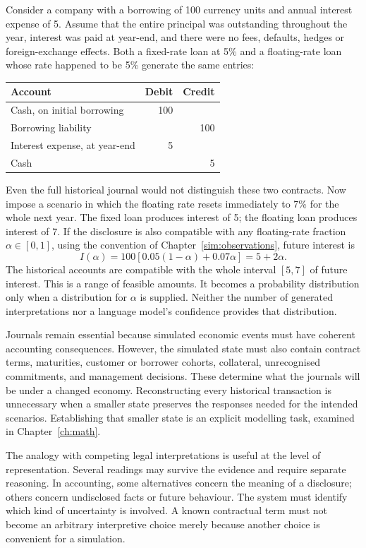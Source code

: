 Consider a company with a borrowing of 100 currency units and annual interest
expense of 5. Assume that the entire principal was outstanding throughout the
year, interest was paid at year-end, and there were no fees, defaults, hedges or
foreign-exchange effects. Both a fixed-rate loan at 5\% and a floating-rate loan
whose rate happened to be 5\% generate the same entries:
\begin{center}
\begin{tabular}{lrr}
\toprule Account & Debit & Credit\\\midrule
Cash, on initial borrowing &100&\\
Borrowing liability &&100\\\midrule
Interest expense, at year-end &5&\\
Cash &&5\\\bottomrule
\end{tabular}
\end{center}
Even the full historical journal would not distinguish these two contracts.
Now impose a scenario in which the floating rate resets immediately to 7\%
for the whole next year. The fixed loan produces interest of 5; the floating
loan produces interest of 7. If the disclosure is also compatible with any
floating-rate fraction $\alpha\in[0,1]$, using the convention of
Chapter~\ref{sim:observations}, future interest is
\begin{equation}\label{eq:running}
 I(\alpha)=100[0.05(1-\alpha)+0.07\alpha]=5+2\alpha.
\end{equation}
The historical accounts are compatible with the whole interval $[5,7]$ of
future interest. This is a range of feasible amounts. It becomes a probability
distribution only when a distribution for $\alpha$ is supplied. Neither the
number of generated interpretations nor a language model's confidence provides
that distribution.

Journals remain essential because simulated economic events must have coherent
accounting consequences. However, the simulated state must also contain
contract terms, maturities, customer or borrower cohorts, collateral,
unrecognised commitments, and management decisions. These determine what the
journals will be under a changed economy. Reconstructing every historical
transaction is unnecessary when a smaller state preserves the responses needed
for the intended scenarios. Establishing that smaller state is an explicit
modelling task, examined in Chapter~\ref{ch:math}.

The analogy with competing legal interpretations is useful at the level of
representation. Several readings may survive the evidence and require separate
reasoning. In accounting, some alternatives concern the meaning of a disclosure;
others concern undisclosed facts or future behaviour. The system must identify
which kind of uncertainty is involved. A known contractual term must not become
an arbitrary interpretive choice merely because another choice is convenient
for a simulation.

